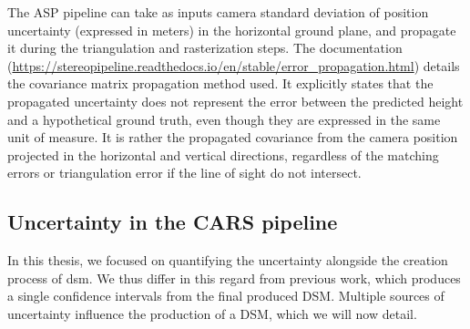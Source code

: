 The ASP pipeline can take as inputs camera standard deviation of position uncertainty (expressed in meters) in the horizontal ground plane, and propagate it during the triangulation and rasterization steps. The documentation (\url{https://stereopipeline.readthedocs.io/en/stable/error_propagation.html}) details the covariance matrix propagation method used. It explicitly states that the propagated uncertainty does not represent the error between the predicted height and a hypothetical ground truth, even though they are expressed in the same unit of measure. It is rather the propagated covariance from the camera position projected in the horizontal and vertical directions, regardless of the matching errors or triangulation error if the line of sight do not intersect.

\subsection{Uncertainty in the CARS pipeline}\label{sec:uncertainty_cars}
In this thesis, we focused on quantifying the uncertainty alongside the creation process of \acrshort{dsm}. We thus differ in this regard from previous work, which produces a single confidence intervals from the final produced DSM. Multiple sources of uncertainty influence the production of a DSM, which we will now detail.

